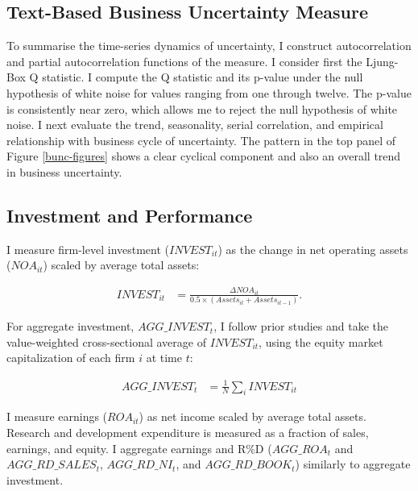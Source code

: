 \documentclass[12pt, letterpaper]{article}
\begin{document}
\subsection{Text-Based Business Uncertainty Measure}
To summarise the time-series dynamics of uncertainty, I construct autocorrelation and partial autocorrelation functions of the measure. I consider first the Ljung-Box Q statistic. I compute the Q statistic and its p-value under the null hypothesis of white noise for values ranging from one through twelve. The p-value is consistently near zero, which allows me to reject the null hypothesis of white noise. I next evaluate the trend, seasonality, serial correlation, and empirical relationship with business cycle of uncertainty. The pattern in the top panel of Figure \ref{bunc-figures} shows a clear cyclical component and also an overall trend in business uncertainty.


\subsection{Investment and Performance}
I measure firm-level investment ($INVEST_{it}$) as the change in net operating assets ($NOA_{it}$) scaled by average total assets:

\begin{equation} \label{eq:invest} 
\begin{aligned} 
INVEST_{it} &= \frac{\Delta NOA_{it}}{0.5\times(Assets_{it} + Assets_{it-1})}.
\end{aligned}
\end{equation}

For aggregate investment, $AGG\_INVEST_{t}$, I follow prior studies and take the value-weighted cross-sectional average of  $INVEST_{it}$, using the equity market capitalization of each firm $i$ at time $t$:

\begin{equation} \label{eq:invest} 
\begin{aligned} 
AGG\_INVEST_{t} &= \frac{1}{N}\sum_{i}INVEST_{it}
\end{aligned}
\end{equation}

I measure earnings ($ROA_{it}$) as net income scaled by average total assets. Research and development expenditure is measured as a fraction of sales, earnings, and equity. I aggregate earnings and R\%D ($AGG\_ROA_{t}$ and $AGG\_RD\_SALES_{t}$, $AGG\_RD\_NI_{t}$, and $AGG\_RD\_BOOK_{t}$) similarly to aggregate investment.
\end{document}
